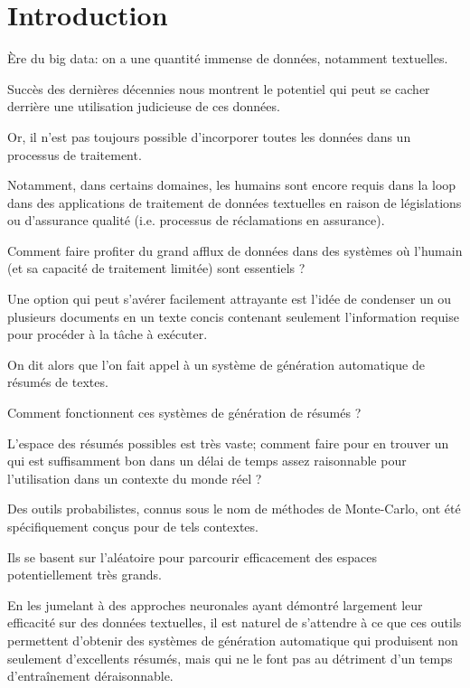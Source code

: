 \chapter*{Introduction}
\label{chap:introduction}       %


Ère du big data: on a une quantité immense de données, notamment textuelles.

Succès des dernières décennies nous montrent le potentiel qui peut se cacher
derrière une utilisation judicieuse de ces données.

Or, il n'est pas toujours possible d'incorporer toutes les données dans
un processus de traitement.

Notamment, dans certains domaines, les humains sont encore requis dans la loop
dans des applications de traitement de données textuelles en raison de
législations ou d'assurance qualité (i.e. processus de réclamations en assurance).

Comment faire profiter du grand afflux de données dans des systèmes où l'humain (et
sa capacité de traitement limitée) sont essentiels ?

Une option qui peut s'avérer facilement attrayante est l'idée de condenser un ou plusieurs
documents en un texte concis contenant seulement l'information requise pour procéder à la
tâche à exécuter.

On dit alors que l'on fait appel à un système de génération automatique de résumés de textes.

Comment fonctionnent ces systèmes de génération de résumés ?

L'espace des résumés possibles est très vaste; comment faire pour en trouver un qui est
suffisamment bon dans un délai de temps assez raisonnable pour l'utilisation dans un contexte
du monde réel ?

Des outils probabilistes, connus sous le nom de méthodes de Monte-Carlo, ont été
spécifiquement conçus pour de tels contextes.

Ils se basent sur l'aléatoire pour parcourir efficacement des espaces potentiellement
très grands.

En les jumelant à des approches neuronales ayant démontré largement leur efficacité sur des données
textuelles, il est naturel de s'attendre à ce que ces outils permettent d'obtenir des
systèmes de génération automatique qui produisent non seulement d'excellents résumés, mais qui
ne le font pas au détriment d'un temps d'entraînement déraisonnable.


